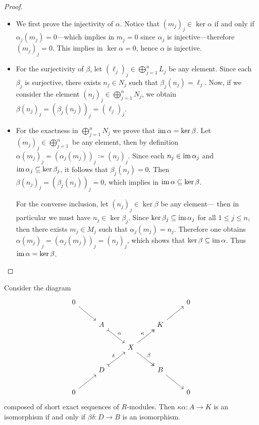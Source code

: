 \begin{proof}
    \begin{itemize}\setlength\itemsep{0em}
        \item We first prove the injectivity of \(\alpha\). Notice that \((m_j)_j
              \in \ker \alpha\) if and only if \(\alpha_j(m_j) = 0\)---which implies in
              \(m_j = 0\) since \(\alpha_j\) is injective---therefore \((m_j)_j =
              0\). This implies in \(\ker \alpha = 0\), hence \(\alpha\) is injective.

        \item For the surjectivity of \(\beta\), let
              \((\ell_j)_j \in \bigoplus_{j=1}^n L_j\) be any element. Since each
              \(\beta_j\) is surjective, there exists \(n_j \in N_j\) such that
              \(\beta_j(n_j) = \ell_j\). Now, if we consider the element
              \((n_j)_j \in \bigoplus_{j=1}^n N_j\), we obtain
              \(\beta(n_j)_j = (\beta_j(n_j))_j = (\ell_j)_j\).

        \item For the exactness in \(\bigoplus_{j=1}^n N_j\) we prove that \(\operatorname{im} \alpha
              = \ker \beta\). Let \((m_j)_j \in \bigoplus_{j=1}^n\) be any element,
              then by definition \(\alpha(m_j)_j = (\alpha_j(m_j))_j \coloneq
              (n_j)_j\). Since each \(n_j \in \operatorname{im} \alpha_j\) and \(\operatorname{im} \alpha_j
              \subseteq \ker \beta_j\), it follows that \(\beta_j(n_j) = 0\). Then
              \(\beta(n_j)_j = (\beta_j(n_j))_j = 0\), which implies in \(\operatorname{im} \alpha
              \subseteq \ker \beta\).

              For the converse inclusion, let \((n_j)_j \in \ker \beta\) be any element---
              then in particular we must have \(n_j \in \ker \beta_j\). Since \(\ker \beta_j
              \subseteq \operatorname{im} \alpha_j\) for all \(1 \leq j \leq n\), then there exists \(m_j
              \in M_j\) such that \(\alpha_j(m_j) = n_j\). Therefore one obtains
              \(\alpha(m_j)_j = (\alpha_j(m_j))_j = (n_j)_j\), which shows that \(\ker \beta
              \subseteq \operatorname{im} \alpha\). Thus \(\operatorname{im} \alpha = \ker \beta\).
    \end{itemize}
\end{proof}

\begin{lemma}
    \label{lemma:big-X-of-short-exact-seq-iso-iff-iso}
    Consider the diagram
    \[
        \begin{tikzcd}
            0 \ar[rd] & & & &0
            \\
            &A \ar[rd, tail, "\alpha"] & &K \ar[ru] &
            \\
            & &X \ar[ru, two heads, "\kappa"] \ar[dr, two heads, "\beta"] & &
            \\
            &D \ar[ru, tail, "\delta"] & &B \ar[rd] &
            \\
            0 \ar[ru] & & & &0
        \end{tikzcd}
    \]
    composed of short exact sequences of \(R\)-modules. Then
    \(\kappa \alpha: A \to K\) is an isomorphism if and only if
    \(\beta \delta: D \to B\) is an isomorphism.
\end{lemma}

